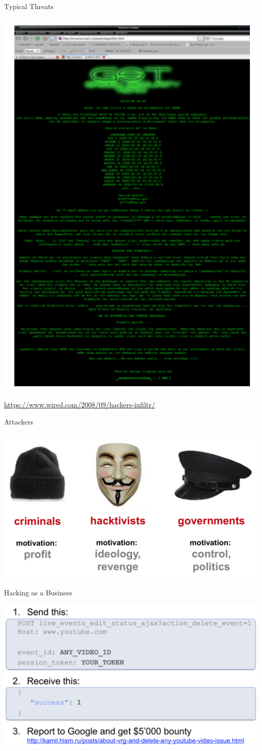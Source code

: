 \documentclass{beamer}
\begin{document}
\begin{frame}{Typical Threats}
  \begin{center}
      \includegraphics[width=0.4\linewidth]{greek-attack.png}  \newline
  	 {\small \url{https://www.wired.com/2008/09/hackers-infiltr/} \par}
  \end{center}
\end{frame}

\begin{frame}{Attackers}
  \begin{center} 
      \includegraphics[width=1\linewidth]{attackers.png} 
    \end{center}
\end{frame}

\begin{frame}{Hacking as a Business}
\begin{center}
\includegraphics[width=0.8\linewidth]{google-bounty.png}
\end{center}
\end{frame}
\end{document}
